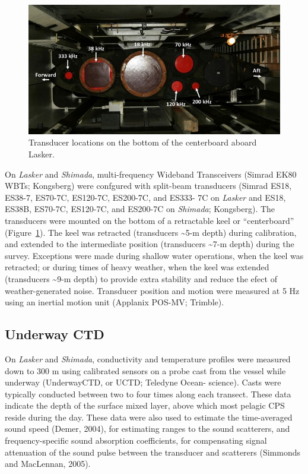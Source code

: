 \documentclass[
  letterpaper,
  oneside,
  open=any]{scrbook}
\begin{document}
\begin{figure}

\includegraphics{content/images/transducers.jpg}

\caption{\label{fig-transducers}Transducer locations on the bottom of
the centerboard aboard Lasker.}

\end{figure}%

On \emph{Lasker} and \emph{Shimada}, multi-frequency Wideband
Transceivers (Simrad EK80 WBTs; Kongsberg) were confgured with
split-beam transducers (Simrad ES18, ES38-7, ES70-7C, ES120-7C,
ES200-7C, and ES333- 7C on \emph{Lasker} and ES18, ES38B, ES70-7C,
ES120-7C, and ES200-7C on \emph{Shimada}; Kongsberg). The transducers
were mounted on the bottom of a retractable keel or ``centerboard''
(Figure~\ref{fig-transducers}). The keel was retracted (transducers
\textasciitilde5-m depth) during calibration, and extended to the
intermediate position (transducers \textasciitilde7-m depth) during the
survey. Exceptions were made during shallow water operations, when the
keel was retracted; or during times of heavy weather, when the keel was
extended (transducers \textasciitilde9-m depth) to provide extra
stability and reduce the efect of weather-generated noise. Transducer
position and motion were measured at 5 Hz using an inertial motion unit
(Applanix POS-MV; Trimble).

\subsection{Underway CTD}\label{underway-ctd}

On \emph{Lasker} and \emph{Shimada}, conductivity and temperature
profiles were measured down to 300 m using calibrated sensors on a probe
cast from the vessel while underway (UnderwayCTD, or UCTD; Teledyne
Ocean- science). Casts were typically conducted between two to four
times along each transect. These data indicate the depth of the surface
mixed layer, above which most pelagic CPS reside during the day. These
data were also used to estimate the time-averaged sound speed (Demer,
2004), for estimating ranges to the sound scatterers, and
frequency-specific sound absorption coefficients, for compensating
signal attenuation of the sound pulse between the transducer and
scatterers (Simmonds and MacLennan, 2005).
\end{document}
